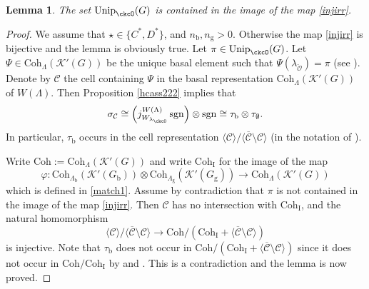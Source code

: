 \documentclass[12pt]{amsart}
\newcommand{\CC}{{\mathcal {C}}}
\newcommand{\CK}{{\mathcal {K}}}
\newcommand{\CO}{{\mathcal {O}}}
\newcommand{\sgn}{\operatorname{sgn}}
\newcommand{\la}{\langle}
\newcommand{\ra}{\rangle}
\numberwithin{equation}{section}
\newtheorem{lem}[thm]{Lemma}
\theoremstyle{remark}
\def\Unip{\mathrm{Unip}}
\def\Coh{\mathrm{Coh}}
\begin{document}
\begin{lem}\label{imageu}
The set $\Unip_{\ckcO}(G)$ is contained in the image of the map \eqref{injirr}.
\end{lem}
\begin{proof}
We  assume that $\star\in\{C^*, D^*\}$, and $n_\mathrm b, n_\mathrm g>0$. Otherwise the map \eqref{injirr} is bijective and the lemma is obviously true.
Let $\pi\in \Unip_{\ckcO}(G)$. Let $\Psi\in \Coh_{ \Lambda}(\CK'(G))$ be the unique basal  element such that $\Psi(\lambda_{\check \CO})=\pi$ (see ).
 Denote by $\CC$ the cell  containing $\Psi$ in the basal representation $ \Coh_{\Lambda}(\CK'(G))$ of $W(\Lambda)$. Then Proposition \ref{hcass222} implies that
 \[
  \sigma_\CC\cong  \left( j_{W_{\lambda_\ckcO}}^{W(\Lambda)} \sgn\right)\otimes \sgn\cong \tau_\mathrm b\otimes \tau_{\emptyset}.
  \]
  In particular, $\tau_\mathrm b$ occurs in the cell representation $\la \CC\ra /\la \overline \CC\setminus \CC\ra$ (in the notation of ).

  Write $\Coh:= \Coh_{\Lambda}(\CK'(G))$ and write $\Coh_{\mathrm I}$ for the image of the map
\[
  \varphi: \Coh_{\Lambda_\mathrm b}(\CK'(G_\mathrm b))\otimes \Coh _{\Lambda_\mathrm g}(\CK'(G_\mathrm g))\rightarrow \Coh_{\Lambda}(\CK'(G))
\]
which is defined in \eqref{match1}. Assume by contradiction that $\pi$ is not contained in the image of the map \eqref{injirr}. Then $\CC$ has no intersection with $\Coh_{\mathrm I}$,  and the natural homomorphism
\[
\la \CC\ra /\la \overline \CC\setminus \CC\ra \rightarrow \Coh/(\Coh_{\mathrm I}+\la \overline \CC\setminus \CC\ra )
\]
is injective. Note that $\tau_\mathrm b$ does not occur in
$\Coh/(\Coh_{\mathrm I}+\la \overline \CC\setminus \CC\ra )$
since it does not occur in  $\Coh/\Coh_{\mathrm I}$ by  and .
This is a contradiction and the lemma is now proved.
\end{proof}
\end{document}
